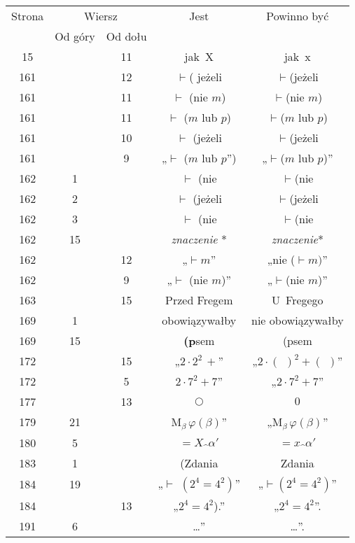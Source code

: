 \documentclass[a4paper,11pt]{article}
\numberwithin{equation}{section}
\begin{document}
\begin{center}
  \begin{tabular}{|c|c|c|c|c|}
    \hline
    Strona & \multicolumn{2}{c|}{Wiersz} & Jest
                              & Powinno być \\ \cline{2-3}
    & Od góry & Od dołu & & \\
    \hline
    15  & & 11 & jak~X & jak~x \\
    161 & & 12 & $\vdash$({ } jeżeli & $\vdash$(jeżeli \\
    161 & & 11 & $\vdash$ (nie $m$) & $\vdash$(nie $m$) \\
    161 & & 11 & $\vdash$ ($m${ } lub $p$) & $\vdash$($m$ lub $p$) \\
    161 & & 10 & $\vdash$ (jeżeli & $\vdash$(jeżeli \\
    161 & &  9 & „$\vdash$ ($m$ lub $p$”)
           & „$\vdash$($m$ lub $p$)” \\
    162 &  1 & & $\vdash$ (nie & $\vdash$(nie \\
    162 &  2 & & $\vdash$ (jeżeli & $\vdash$(jeżeli \\
    162 &  3 & & $\vdash$ (nie & $\vdash$(nie \\
    162 & 15 & & \textit{znaczenie} * & \textit{znaczenie}* \\
    162 & & 12 & „$\vdash m$” & „nie ($\vdash m)$” \\
    162 & &  9 & „$\vdash$ (nie $m$)” & „$\vdash$(nie $m$)” \\
    163 & & 15 & Przed Fregem & U~Fregego \\
    169 &  1 & & obowiązywałby & nie obowiązywałby \\
    169 & 15 & & \textbf{(p}sem & (psem \\
    172 & & 15 & „$2 \cdot 2^{ 2 } \, +$”
           & „$2 \cdot ( \:\: )^{ 2 } + ( \:\: )$” \\
    172 & &  5 & $2 \cdot 7^{ 2 } + 7$” & „$2 \cdot 7^{ 2 } + 7$” \\
    177 & & 13 & $\bigcirc$ & $0$ \\
    179 & 21 & & $\textrm{M}_{ \beta }\, \varphi( \beta )$”
           & „$\textrm{M}_{ \beta }\, \varphi( \beta )$” \\
    180 &  5 & & $=\!\! X \hat{ \;\, } \alpha'$
           & $= x \hat{ \;\, } \alpha'$ \\
    183 &  1 & & (Zdania & Zdania \\
    184 & 19 & & „$\vdash$ $( 2^{ 4 } = 4^{ 2 })$”
           & „$\vdash$$( 2^{ 4 } = 4^{ 2 })$” \\
    184 & & 13 & „$2^{ 4 } = 4^{2}$).” & „$2^{ 4 } = 4^{2}$”. \\
    191 &  6 & & \ldots” & \ldots”. \\
    \hline
  \end{tabular}

\end{center}
\end{document}
